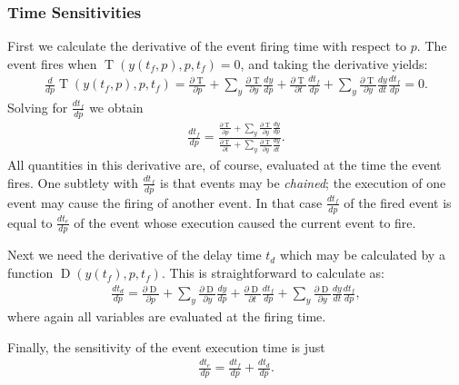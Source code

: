 \documentclass[12pt]{article}
\newcommand{\trigger}{\ensuremath{\operatorname{T}}\xspace}
\newcommand{\delay}{\ensuremath{\operatorname{D}}\xspace}
\begin{document}
\subsubsection{Time Sensitivities}
First we calculate the derivative of the event firing time with respect to $p$.
The event fires when $\trigger(y(t_f, p), p, t_f) = 0$, and taking the derivative yields:
\begin{align}
\frac{d}{dp}\trigger(y(t_f, p), p, t_f) =
   \frac{\partial \trigger}{\partial p} 
   + \sum_y \frac{\partial \trigger}{\partial y} \frac{dy}{dp} 
   + \frac{\partial \trigger}{\partial t} \frac{d t_f}{dp} 
   + \sum_y \frac{\partial \trigger}{\partial y} \frac{dy}{dt}\frac{d t_f}{dp}
= 0.
\end{align}
Solving for $\frac{d t_f}{dp}$ we obtain
\begin{align}
\frac{d t_f}{dp} = 
\frac{
    \frac{\partial \trigger}{\partial p} 
    + \sum_y \frac{\partial \trigger}{\partial y} \frac{dy}{dp}
}{
    \frac{\partial \trigger}{\partial t} 
    + \sum_y \frac{\partial \trigger}{\partial y} \frac{dy}{dt}
}.
\end{align}
All quantities in this derivative are, of course, evaluated at the time the
event fires.
One subtlety with $\frac{d t_f}{dp}$ is that events may be \emph{chained}; the execution of one event may cause the firing of another event.
In that case $\frac{d t_f}{dp}$ of the fired event is equal to $\frac{d t_e}{dp}$ of the event whose execution caused the current event to fire.

Next we need the derivative of the delay time $t_d$ which may be calculated by a function $\delay(y(t_f), p, t_f)$. This is straightforward to calculate as:
\begin{align}
\frac{d t_d}{dp} = 
\frac{\partial \delay}{\partial p} 
+ \sum_y \frac{\partial \delay}{\partial y} \frac{dy}{dp} 
+ \frac{\partial \delay}{\partial t} \frac{d t_f}{dp} 
+ \sum_y \frac{\partial \delay}{\partial y} \frac{dy}{dt}\frac{d t_f}{dp},
\end{align}
where again all variables are evaluated at the firing time.

Finally, the sensitivity of the event execution time is just
\begin{align}
\frac{d t_e}{dp} = \frac{d t_f}{dp} + \frac{d t_d}{dp}.
\end{align}
\end{document}
